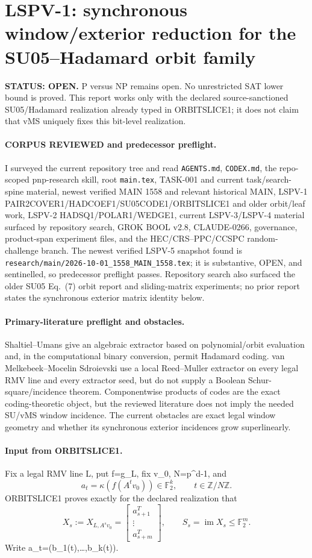 \documentclass[11pt]{article}
\begin{document}
\section*{LSPV-1: synchronous window/exterior reduction for the SU05--Hadamard orbit family}
\textbf{STATUS: OPEN.} P versus NP remains open. No unrestricted SAT lower bound is proved. This report works only with the declared source-sanctioned SU05/Hadamard realization already typed in ORBITSLICE1; it does not claim that vMS uniquely fixes this bit-level realization.

\paragraph{CORPUS REVIEWED and predecessor preflight.}
I surveyed the current repository tree and read \texttt{AGENTS.md}, \texttt{CODEX.md}, the repo-scoped pnp-research skill, root \texttt{main.tex}, TASK-001 and current task/search-spine material, newest verified MAIN 1558 and relevant historical MAIN, LSPV-1 PAIR2COVER1/HADCOEF1/SU05CODE1/ORBITSLICE1 and older orbit/leaf work, LSPV-2 HADSQ1/POLAR1/WEDGE1, current LSPV-3/LSPV-4 material surfaced by repository search, GROK BOOL v2.8, CLAUDE-0266, governance, product-span experiment files, and the HEC/CRS--PPC/CCSPC random-challenge branch. The newest verified LSPV-5 snapshot found is \texttt{research/main/2026-10-01_1558_MAIN_1558.tex}; it is substantive, OPEN, and sentinelled, so predecessor preflight passes. Repository search also surfaced the older SU05 Eq.~(7) orbit report and sliding-matrix experiments; no prior report states the synchronous exterior matrix identity below.

\paragraph{Primary-literature preflight and obstacles.}
Shaltiel--Umans give an algebraic extractor based on polynomial/orbit evaluation and, in the computational binary conversion, permit Hadamard coding. van Melkebeek--Mocelin Sdroievski use a local Reed--Muller extractor on every legal RMV line and every extractor seed, but do not supply a Boolean Schur-square/incidence theorem. Componentwise products of codes are the exact coding-theoretic object, but the reviewed literature does not imply the needed SU/vMS window incidence. The current obstacles are exact legal window geometry and whether its synchronous exterior incidences grow superlinearly.

\paragraph{Input from ORBITSLICE1.}
Fix a legal RMV line L, put f=\widehat g_L, fix v_0, N=p^d-1, and
\[
a_t=\kappa(f(A^tv_0))\in\mathbb F_2^k,\qquad t\in\mathbb Z/N\mathbb Z.
\]
ORBITSLICE1 proves exactly for the declared realization that
\[
X_s:=X_{L,A^sv_0}=
\begin{bmatrix}a_{s+1}^T\\ \vdots\\ a_{s+m}^T\end{bmatrix},
\qquad S_s=\operatorname{im}X_s\le\mathbb F_2^m .
\]
Write a_t=(b_1(t),\ldots,b_k(t)).
\end{document}

